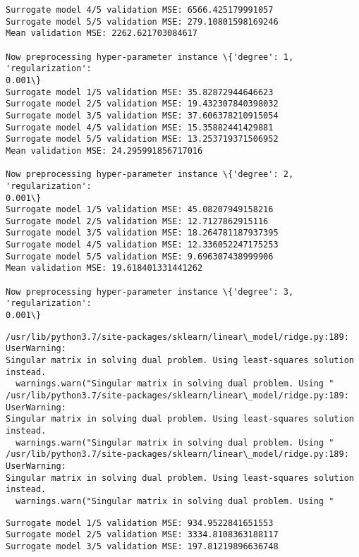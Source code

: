 \documentclass[11pt]{article}
\begin{document}
    \begin{Verbatim}[commandchars=\\\{\}]
Surrogate model 4/5 validation MSE: 6566.425179991057
Surrogate model 5/5 validation MSE: 279.10801598169246
Mean validation MSE: 2262.621703084617

Now preprocessing hyper-parameter instance \{'degree': 1, 'regularization':
0.001\}
Surrogate model 1/5 validation MSE: 35.82872944646623
Surrogate model 2/5 validation MSE: 19.432307840398032
Surrogate model 3/5 validation MSE: 37.606378210915054
Surrogate model 4/5 validation MSE: 15.35882441429881
Surrogate model 5/5 validation MSE: 13.253719371506952
Mean validation MSE: 24.295991856717016

Now preprocessing hyper-parameter instance \{'degree': 2, 'regularization':
0.001\}
Surrogate model 1/5 validation MSE: 45.08207949158216
Surrogate model 2/5 validation MSE: 12.7127862915116
Surrogate model 3/5 validation MSE: 18.264781187937395
Surrogate model 4/5 validation MSE: 12.336052247175253
Surrogate model 5/5 validation MSE: 9.696307438999906
Mean validation MSE: 19.618401331441262

Now preprocessing hyper-parameter instance \{'degree': 3, 'regularization':
0.001\}
    \end{Verbatim}

    \begin{Verbatim}[commandchars=\\\{\}]
/usr/lib/python3.7/site-packages/sklearn/linear\_model/ridge.py:189: UserWarning:
Singular matrix in solving dual problem. Using least-squares solution instead.
  warnings.warn("Singular matrix in solving dual problem. Using "
/usr/lib/python3.7/site-packages/sklearn/linear\_model/ridge.py:189: UserWarning:
Singular matrix in solving dual problem. Using least-squares solution instead.
  warnings.warn("Singular matrix in solving dual problem. Using "
/usr/lib/python3.7/site-packages/sklearn/linear\_model/ridge.py:189: UserWarning:
Singular matrix in solving dual problem. Using least-squares solution instead.
  warnings.warn("Singular matrix in solving dual problem. Using "
    \end{Verbatim}

    \begin{Verbatim}[commandchars=\\\{\}]
Surrogate model 1/5 validation MSE: 934.9522841651553
Surrogate model 2/5 validation MSE: 3334.8108363188117
Surrogate model 3/5 validation MSE: 197.81219896636748
    \end{Verbatim}
\end{document}
